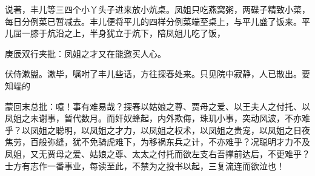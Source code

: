 \begin{parag}


    说著，丰儿等三四个小丫头子进来放小炕桌。凤姐只吃燕窝粥，两碟子精致小菜，每日分例菜已暂减去。丰儿便将平儿的四样分例菜端至桌上，与平儿盛了饭来。平儿屈一膝于炕沿之上，半身犹立于炕下，陪凤姐儿吃了饭，\begin{note}庚辰双行夹批：凤姐之才又在能邀买人心。\end{note}伏侍漱盥。漱毕，嘱咐了丰儿些话，方往探春处来。只见院中寂静，人已散出。要知端的
\end{parag}

\begin{parag}

    \begin{note}蒙回末总批：噫！事有难易哉？探春以姑娘之尊、贾母之爱、以王夫人之付托、以凤姐之未谢事，暂代数月。而奸奴蜂起，内外欺侮，珠玑小事，突动风波，不亦难乎？以凤姐之聪明，以凤姐之才力，以凤姐之权术，以凤姐之贵宠，以凤姐之日夜焦劳，百般弥缝，犹不免骑虎难下，为移祸东兵之计，不亦难乎？况聪明才力不及凤姐，又无贾母之爱、姑娘之尊、太太之付托而欲左支右吾撑前达后，不更难乎？士方有志作一番事业，每读至此，不禁为之投书以起，三复流连而欲泣也！\end{note}
\end{parag}
